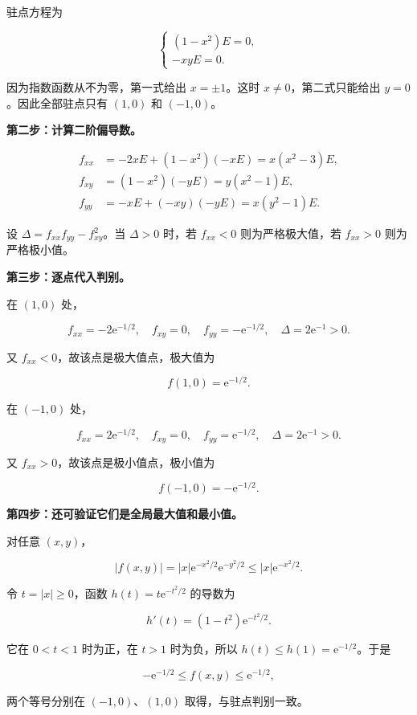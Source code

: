 \documentclass[UTF8,11pt,fontset=windows]{ctexart}
\begin{document}
驻点方程为

$$
\begin{cases}
(1-x^2)E=0,\\
-xyE=0.
\end{cases}
$$

因为指数函数从不为零，第一式给出 $x=\pm1$。这时 $x\ne0$，第二式只能给出 $y=0$。因此全部驻点只有 $(1,0)$ 和 $(-1,0)$。

\textbf{第二步：计算二阶偏导数。}

$$
\begin{aligned}
f_{xx}
&=-2xE+(1-x^2)(-xE)
=x(x^2-3)E,\\
f_{xy}
&=(1-x^2)(-yE)
=y(x^2-1)E,\\
f_{yy}
&=-xE+(-xy)(-yE)
=x(y^2-1)E.
\end{aligned}
$$

设 $\Delta=f_{xx}f_{yy}-f_{xy}^2$。当 $\Delta>0$ 时，若 $f_{xx}<0$ 则为严格极大值，若 $f_{xx}>0$ 则为严格极小值。

\textbf{第三步：逐点代入判别。}

在 $(1,0)$ 处，

$$
f_{xx}=-2\mathrm e^{-1/2},
\quad f_{xy}=0,
\quad f_{yy}=-\mathrm e^{-1/2},
\quad\Delta=2\mathrm e^{-1}>0.
$$

又 $f_{xx}<0$，故该点是极大值点，极大值为

$$
f(1,0)=\mathrm e^{-1/2}.
$$

在 $(-1,0)$ 处，

$$
f_{xx}=2\mathrm e^{-1/2},
\quad f_{xy}=0,
\quad f_{yy}=\mathrm e^{-1/2},
\quad\Delta=2\mathrm e^{-1}>0.
$$

又 $f_{xx}>0$，故该点是极小值点，极小值为

$$
f(-1,0)=-\mathrm e^{-1/2}.
$$

\textbf{第四步：还可验证它们是全局最大值和最小值。}

对任意 $(x,y)$，

$$
|f(x,y)|
=|x|\mathrm e^{-x^2/2}\mathrm e^{-y^2/2}
\le |x|\mathrm e^{-x^2/2}.
$$

令 $t=|x|\ge0$，函数 $h(t)=t\mathrm e^{-t^2/2}$ 的导数为

$$
h'(t)=(1-t^2)\mathrm e^{-t^2/2}.
$$

它在 $0<t<1$ 时为正，在 $t>1$ 时为负，所以 $h(t)\le h(1)=\mathrm e^{-1/2}$。于是

$$
-\mathrm e^{-1/2}\le f(x,y)\le\mathrm e^{-1/2},
$$

两个等号分别在 $(-1,0)$、$(1,0)$ 取得，与驻点判别一致。
\end{document}
